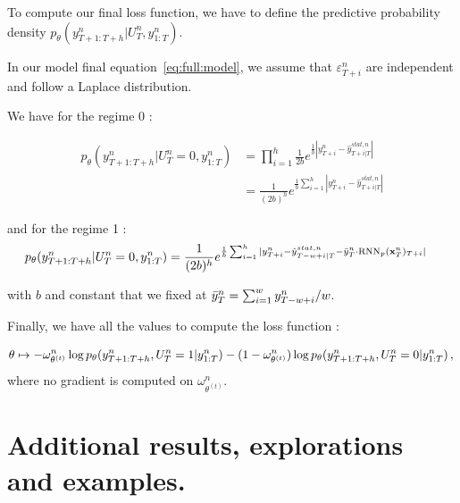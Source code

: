 \documentclass{article} %
\newcommand{\ts}{y}
\newcommand{\tspred}{\hat{\ts}}
\newcommand{\meants}{\Bar{\ts}}
\newcommand{\concatinput}{x}
\newcommand{\fullconcatinput}{{ \bf \concatinput}}
\newcommand{\predictor}{\mathrm{RNN}_p}
\newcommand{\rnnparam}{\theta}
\begin{document}
To compute our final loss function, we have to define the predictive probability density $p_\theta(\ts^n_{T+1:T+h}|U_T^n,\ts^n_{1:T})$.

In our model final equation~\ref{eq:full:model}, we assume that $\varepsilon^n_{T+i}$ are independent and follow a Laplace distribution.

We have for the regime 0 :

\begin{align*}
p_\theta(\ts^n_{T+1:T+h}|U_T^n=0,\ts^n_{1:T}) &= \prod_{i=1}^{h}\frac{1}{2b}e^{\frac{1}{b}|\ts^n_{T+i}  - \tspred^{stat,n}_{T+i|T}|} \\
& = \frac{1}{(2b)^h}e^{\frac{1}{b}\sum_{i=1}^{h}|\ts^n_{T+i}  - \tspred^{stat,n}_{T+i|T}|}
\end{align*}

and for the regime 1 :
\begin{align*}
p_\theta(\ts^n_{T+1:T+h}|U_T^n=0,\ts^n_{1:T}) &= \frac{1}{(2b)^h}e^{\frac{1}{b}\sum_{i=1}^{h}|\ts^n_{T+i}  - \tspred^{stat,n}_{T-w+i|T}-\meants^n_T \cdot \predictor(\fullconcatinput^n_T)_{T+i} |}
\end{align*}

with $b$ and constant that we fixed at $ \meants^n_T = \sum_{i = 1}^{w}  \ts^n_{T-w+i}/w$.

Finally, we have all the values to compute the loss function :

$$
\theta\mapsto - \omega_{\rnnparam^{(t)}}^n \log p_\theta(\ts^n_{T+1:T+h},U_T^n=1|\ts^n_{1:T})
- (1-\omega_{\rnnparam^{(t)}}^n) \log p_\theta(\ts^n_{T+1:T+h},U_T^n=0|\ts^n_{1:T})\,, \\
$$
where no gradient is computed on $\omega_{\rnnparam^{(t)}}^n$. 




\section{Additional results, explorations and examples.}
\end{document}

